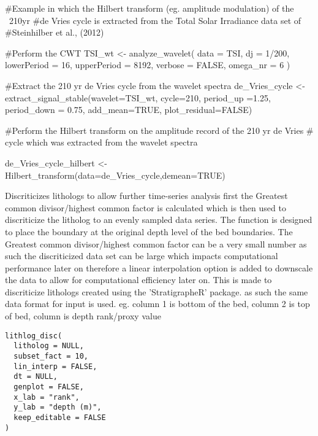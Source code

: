 \documentclass[a4paper]{book}
\begin{document}
\begin{Examples}
\begin{ExampleCode}
#Example in which the Hilbert transform (eg. amplitude modulation) of the ~210yr
#de Vries cycle is extracted from the Total Solar Irradiance data set of
#Steinhilber et al., (2012)

#Perform the CWT
TSI_wt <-
analyze_wavelet(
data = TSI,
dj = 1/200,
lowerPeriod = 16,
upperPeriod = 8192,
   verbose = FALSE,
   omega_nr = 6
 )

#Extract the 210 yr de Vries cycle from the wavelet spectra
de_Vries_cycle <- extract_signal_stable(wavelet=TSI_wt,
cycle=210,
period_up =1.25,
period_down = 0.75,
add_mean=TRUE,
plot_residual=FALSE)

#Perform the Hilbert transform on the amplitude record of the 210 yr de Vries
# cycle which was extracted from the wavelet spectra

de_Vries_cycle_hilbert <- Hilbert_transform(data=de_Vries_cycle,demean=TRUE)

\end{ExampleCode}
\end{Examples}
%
\begin{Description}
Discriticizes lithologs to allow further time-series analysis first the
Greatest common divisor/highest common factor is calculated which is then used to discriticize
the litholog to an evenly sampled data series. The function is designed to place the boundary
at the original depth level of the bed boundaries. The Greatest common divisor/highest common factor can
be a very small number as such the discriticized data set can be large which impacts computational
performance later on therefore a linear interpolation option is added to downscale the data to allow
for computational efficiency later on. This is made to discriticize lithologs created using the
'StratigrapheR' package. as such the same data format for input is used.
eg. column 1 is bottom of the bed, column 2 is top of bed, column is depth rank/proxy value
\end{Description}
%
\begin{Usage}
\begin{verbatim}
lithlog_disc(
  litholog = NULL,
  subset_fact = 10,
  lin_interp = FALSE,
  dt = NULL,
  genplot = FALSE,
  x_lab = "rank",
  y_lab = "depth (m)",
  keep_editable = FALSE
)
\end{verbatim}
\end{Usage}
%
\end{document}
